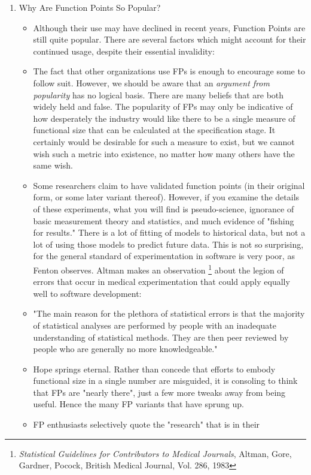 \documentclass{article}
\begin{document}
\begin{enumerate}
\item Why Are Function Points So Popular?
\label{sec:orgheadline383}

\begin{itemize}
\item Although their use may have declined in recent years, Function Points
are still quite popular. There are several factors which might
account for their continued usage, despite their essential
invalidity:
\item The fact that other organizations use FPs is enough to encourage some
to follow suit. However, we should be aware that an \emph{argument from
popularity} has no logical basis. There are many beliefs that are
both widely held and false. The popularity of FPs may only be
indicative of how desperately the industry would like there to be a
single measure of functional size that can be calculated at the
specification stage. It certainly would be desirable for such a
measure to exist, but we cannot wish such a metric into existence, no
matter how many others have the same wish.
\item Some researchers claim to have validated function points (in their
original form, or some later variant thereof). However, if you
examine the details of these experiments, what you will find is
pseudo-science, ignorance of basic measurement theory and statistics,
and much evidence of "fishing for results." There is a lot of fitting
of models to historical data, but not a lot of using those models to
predict future data. This is not so surprising, for the general
standard of experimentation in software is very poor, as Fenton
observes. Altman makes an observation \footnote{\emph{Statistical Guidelines for Contributors to Medical Journals},
Altman, Gore, Gardner, Pocock, British Medical Journal, Vol. 286,
1983} about the legion of
errors that occur in medical experimentation that could apply equally
well to software development:
\item "The main reason for the plethora of statistical errors is that the
majority of statistical analyses are performed by people with an
inadequate understanding of statistical methods. They are then peer
reviewed by people who are generally no more knowledgeable."
\item Hope springs eternal. Rather than concede that efforts to embody
functional size in a single number are misguided, it is consoling to
think that FPs are "nearly there", just a few more tweaks away from
being useful. Hence the many FP variants that have sprung up.
\item FP enthusiasts selectively quote the "research" that is in their

\end{itemize}
\end{enumerate}
\end{document}
